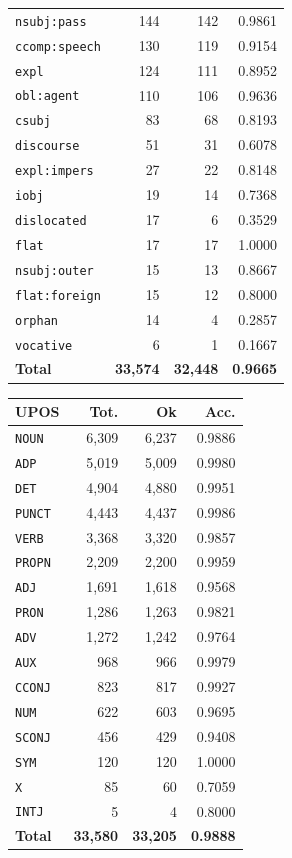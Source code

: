 \begin{table}[ht]
\begin{minipage}[t]{0.55\linewidth}
\begin{tabular}{lrrr}
\texttt{nsubj\!:\!pass} & 144 & 142 & 0.9861 \\
\texttt{ccomp\!:\!speech} & 130 & 119 & 0.9154 \\
\texttt{expl} & 124 & 111 & 0.8952 \\
\texttt{obl\!:\!agent} & 110 & 106 & 0.9636 \\
\texttt{csubj} & 83 & 68 & 0.8193 \\
\texttt{discourse} & 51 & 31 & 0.6078 \\
\texttt{expl\!:\!impers} & 27 & 22 & 0.8148 \\
\texttt{iobj} & 19 & 14 & 0.7368 \\
\texttt{dislocated} & 17 & 6 & 0.3529 \\
\texttt{flat} & 17 & 17 & 1.0000 \\
\texttt{nsubj\!:\!outer} & 15 & 13 & 0.8667 \\
\texttt{flat\!:\!foreign} & 15 & 12 & 0.8000 \\
\texttt{orphan} & 14 & 4 & 0.2857 \\
\texttt{vocative} & 6 & 1 & 0.1667 \\
\midrule
\textbf{Total} & \textbf{33,574} & \textbf{32,448} & \textbf{0.9665} \\
\bottomrule
\end{tabular}
\end{minipage}
\hfill
\begin{minipage}[t]{0.42\linewidth}
\centering\scriptsize
\begin{tabular}{lrrr}
\toprule
\textbf{UPOS} & \textbf{Tot.} & \textbf{Ok} & \textbf{Acc.} \\
\midrule
\texttt{NOUN} & 6,309 & 6,237 & 0.9886 \\
\texttt{ADP} & 5,019 & 5,009 & 0.9980 \\
\texttt{DET} & 4,904 & 4,880 & 0.9951 \\
\texttt{PUNCT} & 4,443 & 4,437 & 0.9986 \\
\texttt{VERB} & 3,368 & 3,320 & 0.9857 \\
\texttt{PROPN} & 2,209 & 2,200 & 0.9959 \\
\texttt{ADJ} & 1,691 & 1,618 & 0.9568 \\
\texttt{PRON} & 1,286 & 1,263 & 0.9821 \\
\texttt{ADV} & 1,272 & 1,242 & 0.9764 \\
\texttt{AUX} & 968 & 966 & 0.9979 \\
\texttt{CCONJ} & 823 & 817 & 0.9927 \\
\texttt{NUM} & 622 & 603 & 0.9695 \\
\texttt{SCONJ} & 456 & 429 & 0.9408 \\
\texttt{SYM} & 120 & 120 & 1.0000 \\
\texttt{X} & 85 & 60 & 0.7059 \\
\texttt{INTJ} & 5 & 4 & 0.8000 \\
\midrule
\textbf{Total} & \textbf{33,580} & \textbf{33,205} & \textbf{0.9888} \\
\bottomrule
\end{tabular}
\end{minipage}
\end{table}
